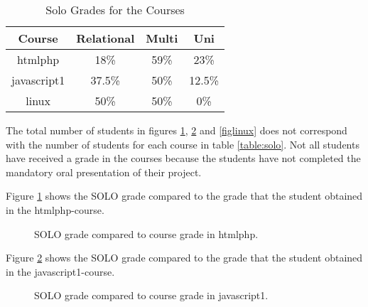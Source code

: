 \documentclass[twoside,twocolumn,a4paper,11pt,english]{article}
\begin{document}
\begin{table}[H]
\caption{Solo Grades for the Courses}
\centering
\begin{tabular}{c | c c c}
Course & Relational & Multi & Uni \\ [0.5ex] %
\hline
htmlphp & 18\% & 59\% & 23\% \\
javascript1 & 37.5\% & 50\% & 12.5\%\\
linux & 50\% & 50\% & 0\%\\ [1ex]
\end{tabular}
\label{table:solorelative}
\end{table}


The total number of students in figures \ref{fightmlphp}, \ref{figjavascript1} and \ref{figlinux} does not correspond with the number of students for each course in table \ref{table:solo}. Not all students have received a grade in the courses because the students have not completed the mandatory oral presentation of their project.

Figure \ref{fightmlphp} shows the SOLO grade compared to the grade that the student obtained in the htmlphp-course.

\begin{figure}[H]
\caption{SOLO grade compared to course grade in htmlphp.}
\label{fightmlphp}
\end{figure}

Figure \ref{figjavascript1} shows the SOLO grade compared to the grade that the student obtained in the javascript1-course.

\begin{figure}[H]
\caption{SOLO grade compared to course grade in javascript1.}
\label{figjavascript1}
\end{figure}
\end{document}
